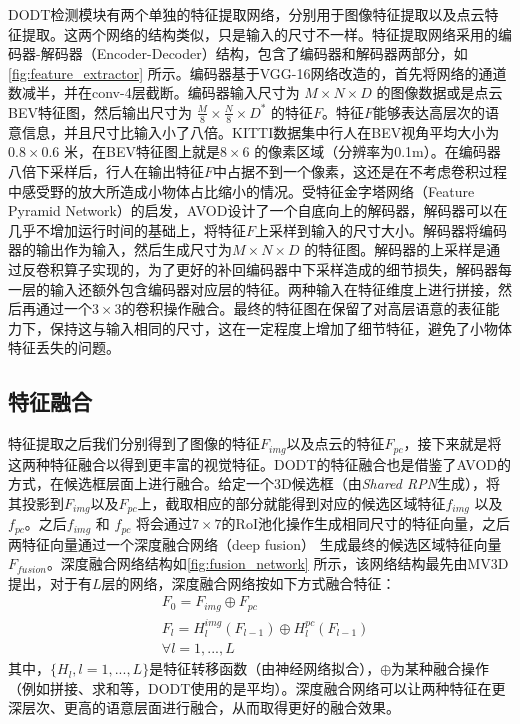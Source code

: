 DODT检测模块有两个单独的特征提取网络，分别用于图像特征提取以及点云特征提取。这两个网络的结构类似，只是输入的尺寸不一样。特征提取网络采用的编码器-解码器（Encoder-Decoder）结构，包含了编码器和解码器两部分，如\figurename \ref{fig:feature_extractor} 所示。编码器基于VGG-16网络改造的，首先将网络的通道数减半，并在conv-4层截断。编码器输入尺寸为 $M \times N \times D$ 的图像数据或是点云BEV特征图，然后输出尺寸为 $\frac{M}{8} \times \frac{N}{8} \times D^*$ 的特征$F$。特征$F$能够表达高层次的语意信息，并且尺寸比输入小了八倍。KITTI数据集中行人在BEV视角平均大小为$0.8 \times 0.6$ 米，在BEV特征图上就是$8 \times 6$ 的像素区域（分辨率为0.1m）。在编码器八倍下采样后，行人在输出特征$F$中占据不到一个像素，这还是在不考虑卷积过程中感受野的放大所造成小物体占比缩小的情况。受特征金字塔网络（Feature Pyramid Network）的启发，AVOD设计了一个自底向上的解码器，解码器可以在几乎不增加运行时间的基础上，将特征$F$上采样到输入的尺寸大小。解码器将编码器的输出作为输入，然后生成尺寸为$M \times N \times D$ 的特征图。解码器的上采样是通过反卷积算子实现的，为了更好的补回编码器中下采样造成的细节损失，解码器每一层的输入还额外包含编码器对应层的特征。两种输入在特征维度上进行拼接，然后再通过一个$3 \times 3$的卷积操作融合。最终的特征图在保留了对高层语意的表征能力下，保持这与输入相同的尺寸，这在一定程度上增加了细节特征，避免了小物体特征丢失的问题。

\subsection{特征融合}



特征提取之后我们分别得到了图像的特征$F_{img}$以及点云的特征$F_{pc}$，接下来就是将这两种特征融合以得到更丰富的视觉特征。DODT的特征融合也是借鉴了AVOD的方式，在候选框层面上进行融合。给定一个3D候选框（由\textit{Shared RPN}生成），将其投影到$F_{img}$以及$F_{pc}$上，截取相应的部分就能得到对应的候选区域特征$f_{img}$ 以及$f_{pc}$。之后$f_{img}$ 和 $f_{pc}$ 将会通过$7 \times 7$的RoI池化操作生成相同尺寸的特征向量，之后两特征向量通过一个深度融合网络（deep fusion） 生成最终的候选区域特征向量$F_{fusion}$。深度融合网络结构如\figurename \ref{fig:fusion_network} 所示，该网络结构最先由MV3D\cite{chen2017multi}提出，对于有$L$层的网络，深度融合网络按如下方式融合特征：
\begin{equation}
	\begin{aligned}
		& F_0 = F_{img} \oplus F_{pc}\\
		& F_l = H^{img}_l(F_{l-1}) \oplus H^{pc}_l(F_{l-1})\\
		& \forall l = 1, ..., L
	\end{aligned}
\label{con:deep_fusion}
\end{equation}
其中，$\{H_l, l=1,...,L\}$是特征转移函数（由神经网络拟合），$\oplus$为某种融合操作（例如拼接、求和等，DODT使用的是平均）。深度融合网络可以让两种特征在更深层次、更高的语意层面进行融合，从而取得更好的融合效果。

